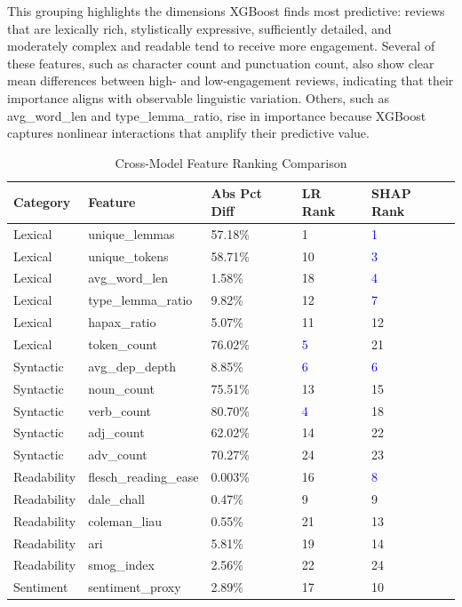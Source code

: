 \documentclass[12pt]{article}
\begin{document}
This grouping highlights the dimensions XGBoost finds most predictive: reviews that are lexically rich, stylistically expressive, sufficiently detailed, and moderately complex and readable tend to receive more engagement. Several of these features, such as character count and punctuation count, also show clear mean differences between high- and low-engagement reviews, indicating that their importance aligns with observable linguistic variation. Others, such as avg\_word\_len and type\_lemma\_ratio, rise in importance because XGBoost captures nonlinear interactions that amplify their predictive value.


\begin{longtable}{lllll}
\caption{Cross-Model Feature Ranking Comparison} \\
\textbf{Category} & \textbf{Feature} & \textbf{Abs Pct Diff} & \textbf{LR Rank} & \textbf{SHAP Rank} \\
\hline
Lexical & unique\_lemmas & 57.18\% & {\color{blue} 1} & \textcolor{blue}{1} \\
Lexical & unique\_tokens & 58.71\% & 10 & \textcolor{blue}{3} \\ 
Lexical & avg\_word\_len & 1.58\% & 18 & \textcolor{blue}{4} \\ 
Lexical & type\_lemma\_ratio & 9.82\% & 12 & \textcolor{blue}{7} \\ 
Lexical & hapax\_ratio & 5.07\% & 11 & 12 \\
Lexical & token\_count & 76.02\% & \textcolor{blue}{5} & 21 \\
Syntactic & avg\_dep\_depth & 8.85\% & \textcolor{blue}{6} & \textcolor{blue}{6} \\
Syntactic & noun\_count & 75.51\% & 13 & 15 \\
Syntactic & verb\_count & 80.70\% & \textcolor{blue}{4} & 18 \\
Syntactic & adj\_count & 62.02\% & 14 & 22 \\
Syntactic & adv\_count & 70.27\% & 24 & 23 \\
Readability & flesch\_reading\_ease & 0.003\% & 16 & \textcolor{blue}{8} \\
Readability & dale\_chall & 0.47\% & 9 & 9 \\
Readability & coleman\_liau & 0.55\% & 21 & 13 \\
Readability & ari & 5.81\% & 19 & 14 \\
Readability & smog\_index & 2.56\% & 22 & 24 \\
Sentiment & sentiment\_proxy & 2.89\% & 17 & 10 \\

\end{longtable}
\end{document}
